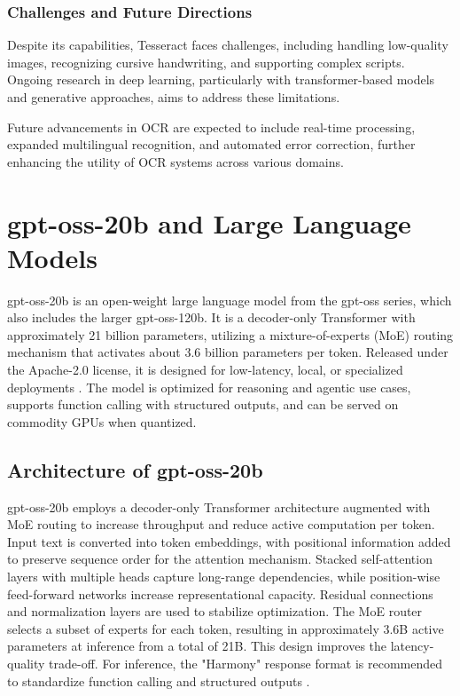 \subsubsection{Challenges and Future Directions}

Despite its capabilities, Tesseract faces challenges, including handling low-quality images, recognizing cursive handwriting, and supporting complex scripts. Ongoing research in deep learning, particularly with transformer-based models and generative approaches, aims to address these limitations.

Future advancements in OCR are expected to include real-time processing, expanded multilingual recognition, and automated error correction, further enhancing the utility of OCR systems across various domains.

\section{gpt-oss-20b and Large Language Models}

gpt-oss-20b is an open-weight large language model from the gpt-oss series, which also includes the larger gpt-oss-120b. It is a decoder-only Transformer with approximately 21 billion parameters, utilizing a mixture-of-experts (MoE) routing mechanism that activates about 3.6 billion parameters per token. Released under the Apache-2.0 license, it is designed for low-latency, local, or specialized deployments \cite{openai2025gptoss}. The model is optimized for reasoning and agentic use cases, supports function calling with structured outputs, and can be served on commodity GPUs when quantized.

\subsection{Architecture of gpt-oss-20b}

gpt-oss-20b employs a decoder-only Transformer architecture augmented with MoE routing to increase throughput and reduce active computation per token. Input text is converted into token embeddings, with positional information added to preserve sequence order for the attention mechanism. Stacked self-attention layers with multiple heads capture long-range dependencies, while position-wise feed-forward networks increase representational capacity. Residual connections and normalization layers are used to stabilize optimization. The MoE router selects a subset of experts for each token, resulting in approximately 3.6B active parameters at inference from a total of 21B. This design improves the latency-quality trade-off. For inference, the "Harmony" response format is recommended to standardize function calling and structured outputs \cite{openai2025gptoss}.

